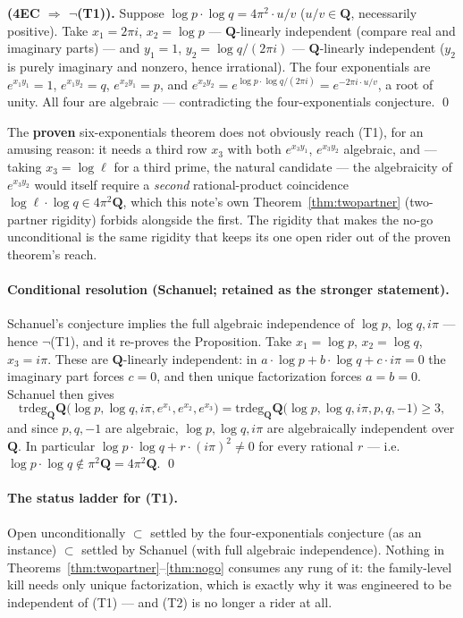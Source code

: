 \documentclass[11pt]{article}
\theoremstyle{definition}
\theoremstyle{remark}
\newcommand{\Q}{\mathbf{Q}}
\newcommand{\trdeg}{\mathrm{trdeg}}
\begin{document}
\textbf{(4EC $\Longrightarrow$ $\neg$(T1)).} Suppose
$\log p\cdot\log q = 4\pi^2\cdot u/v$ ($u/v \in \Q$, necessarily positive).
Take $x_1 = 2\pi i$, $x_2 = \log p$ --- $\Q$-linearly independent (compare
real and imaginary parts) --- and $y_1 = 1$, $y_2 = \log q/(2\pi i)$ ---
$\Q$-linearly independent ($y_2$ is purely imaginary and nonzero, hence
irrational). The four exponentials are $e^{x_1 y_1} = 1$,
$e^{x_1 y_2} = q$, $e^{x_2 y_1} = p$, and
$e^{x_2 y_2} = e^{\log p\cdot\log q/(2\pi i)} = e^{-2\pi i\cdot u/v}$, a
root of unity. All four are algebraic --- contradicting the
four-exponentials conjecture. \qed

The \textbf{proven} six-exponentials theorem does not obviously reach (T1),
for an amusing reason: it needs a third row $x_3$ with both $e^{x_3 y_1}$,
$e^{x_3 y_2}$ algebraic, and --- taking $x_3 = \log \ell$ for a third prime,
the natural candidate --- the algebraicity of $e^{x_3 y_2}$ would itself
require a \emph{second} rational-product coincidence
$\log \ell\cdot\log q \in 4\pi^2\Q$, which this note's own
Theorem~\ref{thm:twopartner} (two-partner rigidity) forbids alongside the
first. The rigidity that makes the no-go unconditional is the same rigidity
that keeps its one open rider out of the proven theorem's reach.

\paragraph{Conditional resolution (Schanuel; retained as the stronger
statement).}
Schanuel's conjecture implies the full algebraic independence of
$\log p, \log q, i\pi$ --- hence $\neg$(T1), and it re-proves the
Proposition. Take $x_1 = \log p$, $x_2 = \log q$, $x_3 = i\pi$. These are
$\Q$-linearly independent: in $a\cdot\log p + b\cdot\log q + c\cdot i\pi = 0$
the imaginary part forces $c = 0$, and then unique factorization forces
$a = b = 0$. Schanuel then gives
\[
\trdeg_{\Q} \Q\bigl(\log p, \log q, i\pi, e^{x_1}, e^{x_2}, e^{x_3}\bigr)
= \trdeg_{\Q} \Q\bigl(\log p, \log q, i\pi, p, q, -1\bigr) \geq 3 ,
\]
and since $p, q, -1$ are algebraic, $\log p, \log q, i\pi$ are algebraically
independent over $\Q$. In particular
$\log p\cdot\log q + r\cdot(i\pi)^2 \neq 0$ for every rational $r$ --- i.e.\
$\log p\cdot\log q \notin \pi^2\Q = 4\pi^2\Q$. \qed

\paragraph{The status ladder for (T1).}
Open unconditionally $\subset$ settled by the four-exponentials conjecture
(as an instance) $\subset$ settled by Schanuel (with full algebraic
independence). Nothing in Theorems~\ref{thm:twopartner}--\ref{thm:nogo}
consumes any rung of it: the family-level kill needs only unique
factorization, which is exactly why it was engineered to be independent of
(T1) --- and (T2) is no longer a rider at all.
\end{document}
